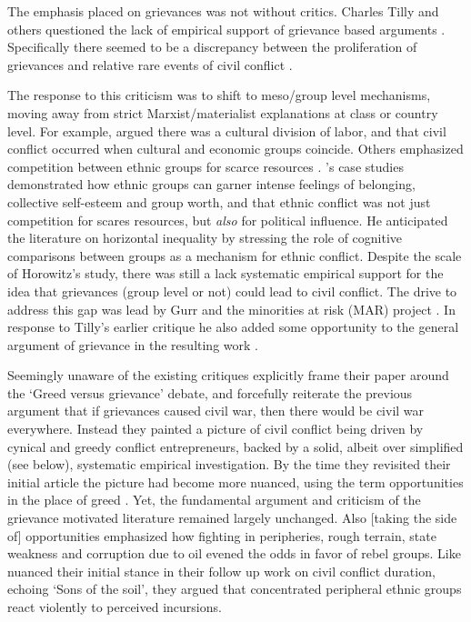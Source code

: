 \documentclass[12pt]{article}
\begin{document}
The emphasis placed on grievances was not without critics. Charles Tilly and
others questioned the lack of empirical support of grievance based arguments
\citep{Oberschall_1978, Brush_1996}. Specifically there seemed to be a
discrepancy between the proliferation of grievances and relative rare events of
civil conflict \citep{Snyder_1972, TillyCharles1978Fmtr, Skocpol_1979}. 

The response to this criticism was to shift to meso/group level mechanisms,
moving away from strict Marxist/materialist explanations at class or country
level. For example, \citet{Hechter_1978} argued there was a cultural division of
labor, and that civil conflict occurred when cultural and economic groups
coincide. Others emphasized competition between ethnic groups for scarce
resources \citep{barth1969}. \citet{Horowitz1985}'s case studies demonstrated
how ethnic groups can garner intense feelings of belonging, collective
self-esteem and group worth, and that ethnic conflict was not just competition
for scares resources, but \textit{also} for political influence. He anticipated
the literature on horizontal inequality by stressing the role of cognitive
comparisons between groups as a mechanism for ethnic conflict. Despite the scale
of Horowitz's study, there was still a lack systematic empirical support for the
idea that grievances (group level or not) could lead to civil conflict. The
drive to address this gap was lead by Gurr and the minorities at risk (MAR)
project \citet{GurrTedRobert1993Mar:}. In response to Tilly's earlier
critique he also added some opportunity to the general argument of grievance in
the resulting work \citep{Gurr_1993}. 

Seemingly unaware of the existing critiques \citet{Collier2004} explicitly frame
their paper around the `Greed versus grievance' debate, and forcefully reiterate
the previous argument that if grievances caused civil war, then there would be
civil war everywhere. Instead they painted a picture of civil conflict being
driven by cynical and greedy conflict entrepreneurs, backed by a solid, albeit
over simplified (see below), systematic empirical investigation. By the time
they revisited their initial article the picture had become more nuanced, using
the term opportunities in the place of greed \citep{Collier2009}. Yet, the
fundamental argument and criticism of the grievance motivated literature
remained largely unchanged. Also [taking the side of] opportunities
\citet{Fearon2003} emphasized how fighting in peripheries, rough terrain, state
weakness and corruption due to oil evened the odds in favor of rebel groups.
Like \citet{Collier2009} \citet{Fearon_2004} nuanced their initial stance in
their follow up work on civil conflict duration, echoing
\citet{WeinerMyron1978SotS} `Sons of the soil', they argued that concentrated
peripheral ethnic groups react violently to perceived incursions.
\end{document}
